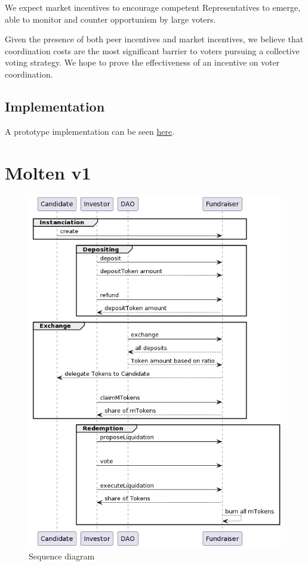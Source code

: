 \documentclass[
]{article}
\begin{document}
We expect market incentives to encourage competent Representatives to
emerge, able to monitor and counter opportunism by large voters.

Given the presence of both peer incentives and market incentives, we
believe that coordination costs are the most significant barrier to
voters pursuing a collective voting strategy. We hope to prove the
effectiveness of an incentive on voter coordination.

\hypertarget{implementation}{%
\subsection{Implementation}\label{implementation}}

A prototype implementation can be seen
\href{https://github.com/butterymoney/molten/}{here}.
\hypertarget{molten-v1}{%
\section{Molten v1}\label{molten-v1}}

\begin{figure}
\centering
\includegraphics[width=\textwidth]{./img/molten-fundraiser-v1-seq-diag.png}
\caption{Sequence diagram}
\end{figure}
\end{document}
